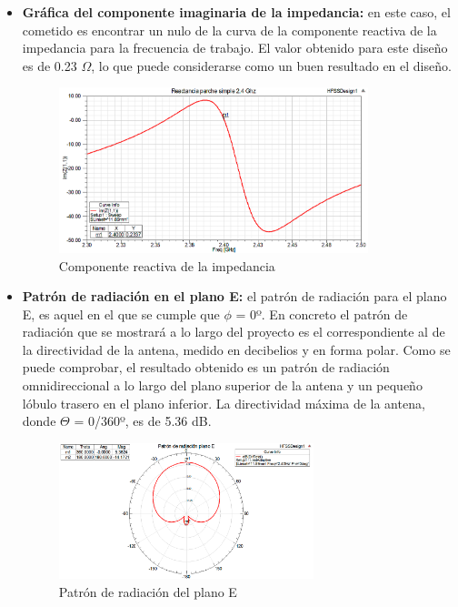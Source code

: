 \begin{itemize}
\item \textbf{Gráfica del componente imaginaria de la impedancia: }en este caso, el cometido es encontrar un nulo de la curva de la componente reactiva de la impedancia para la frecuencia de trabajo. El valor obtenido para este diseño es de 0.23 $\Omega$, lo que puede considerarse como un buen resultado en el diseño.
	\begin{figure}[H]
    \centering
        \includegraphics[width=0.85\textwidth]{archivos/analisis/1x11/2}
        \caption{Componente reactiva de la impedancia}
        \label{fig:imaimpe}
	\end{figure}

\item \textbf{Patrón de radiación en el plano E: }el patrón de radiación para el plano E, es aquel en el que se cumple que $\phi $ = 0º. En concreto el patrón de radiación que se mostrará a lo largo del proyecto es el correspondiente al de la directividad de la antena, medido en decibelios y en forma polar. Como se puede comprobar, el resultado obtenido es un patrón de radiación omnidireccional a lo largo del plano superior de la antena y un pequeño lóbulo trasero en el plano inferior. La directividad máxima de la antena, donde $\Theta$ = 0/360º, es de 5.36 dB. 
	\begin{figure}[H]
    \centering
        \includegraphics[width=0.7\textwidth]{archivos/analisis/1x11/4}
        \caption{Patrón de radiación del plano E}
        \label{fig:radE}
	\end{figure}


\end{itemize}
